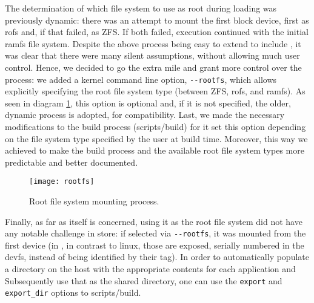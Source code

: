 The determination of which file system to use as root during loading was
previously dynamic: there was an attempt to mount the first block device, first
as rofs and, if that failed, as ZFS. If both failed, execution continued with
the initial ramfs file system. Despite the above process being easy to extend to
include \viofs{}, it was clear that there were many silent assumptions, without
allowing much user control. Hence, we decided to go the extra mile and grant
more control over the process: we added a kernel command line option,
\texttt{-{}-rootfs}, which allows explicitly specifying the root file system
type (between ZFS, rofs, \viofs{} and ramfs). As seen in diagram
\ref{fig:rootfs}, this option is optional and, if it is not specified, the
older, dynamic process is adopted, for compatibility. Last, we made the
necessary modifications to the build process (scripts/build) for it set this
option depending on the file system type specified by the user at build time.
Moreover, this way we achieved to make the build process and the available
root file system types more predictable and better documented.

\begin{figure}
    \centering
    \texttt{[image: rootfs]}
    \caption{Root file system mounting process.}
    \label{fig:rootfs}
\end{figure}

Finally, as far as \viofs{} itself is concerned, using it as the root file
system did not have any notable challenge in store: if selected via
\texttt{-{}-rootfs}, it was mounted from the first \viofs{} device (in \osv{},
in contrast to linux, those are exposed, serially numbered in the devfs,
instead of being identified by their \viofs{} tag). In order to automatically
populate a directory on the host with the appropriate contents for each
application and Subsequently use that as the \viofs{} shared directory, one can
use the \texttt{export} and \texttt{export\_dir} options to scripts/build.
